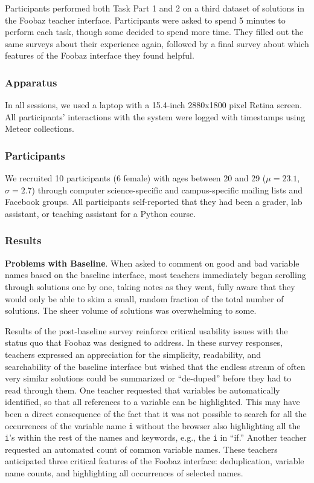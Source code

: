 {{Participants performed both Task Part 1 and 2 on a third dataset of solutions in the Foobaz teacher interface. Participants were asked to spend 5 minutes to perform each task, though some decided to spend more time. They filled out the same surveys about their experience again, followed by a final survey about which features of the Foobaz interface they found helpful. 

\subsubsection{Apparatus}

In all sessions, we used a laptop with a 15.4-inch 2880x1800 pixel Retina screen. All participants' interactions with the system were logged with timestamps using Meteor collections.

\subsubsection{Participants}

We recruited 10 participants (6 female) with ages between 20 and 29 ($\mu=23.1$, $\sigma=2.7$) through computer science-specific and campus-specific mailing lists and Facebook groups. All participants self-reported that they had been a grader, lab assistant, or teaching assistant for a Python course. 

\subsubsection{Results}

\textbf{Problems with Baseline}. When asked to comment on good and bad variable names based on the baseline interface, most teachers immediately began scrolling through solutions one by one, taking notes as they went, fully aware that they would only be able to skim a small, random fraction of the total number of solutions. The sheer volume of solutions was overwhelming to some. 

Results of the post-baseline survey reinforce critical usability issues with the status quo that Foobaz was designed to address. In these survey responses, teachers expressed an appreciation for the simplicity, readability, and searchability of the baseline interface but wished that the endless stream of often very similar solutions could be summarized or ``de-duped'' before they had to read through them. One teacher requested that variables be automatically identified, so that all references to a variable can be highlighted. This may have been a direct consequence of the fact that it was not possible to search for all the occurrences of the variable name \texttt{i} without the browser also highlighting all the \texttt{i}'s within the rest of the names and keywords, e.g., the \texttt{i} in ``if.'' Another teacher requested an automated count of common variable names. These teachers anticipated three critical features of the Foobaz interface: deduplication, variable name counts, and highlighting all occurrences of selected names.

}}
